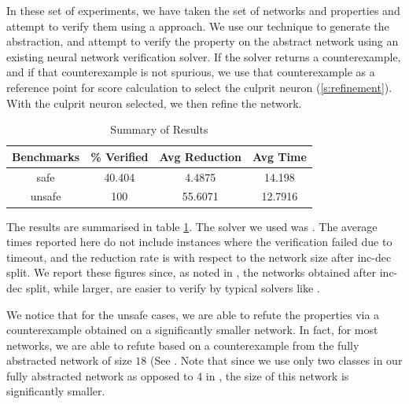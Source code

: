 
In these set of experiments, we have taken the \acasxu set of
networks  and
properties and attempt to verify them using a \cegar approach. We use our
technique to generate the abstraction, and attempt to verify the property on the
abstract network using an existing neural network verification solver. If the
solver returns a counterexample, and if that counterexample is not spurious, we
use that counterexample as a reference point for score calculation  to select
the culprit neuron (\ref{s:refinement}). With the culprit neuron selected, we
then refine the network.

\begin{table}
\begin{tabular}{ |c|c|c|c| }
\hline
Benchmarks &    \% Verified &  Avg Reduction &  Avg Time \\
\hline
safe       &        40.404  &         4.4875 &   14.198  \\
unsafe     &       100      &        55.6071 &   12.7916 \\
\hline
\end{tabular}
\caption{Summary of \acasxu Results }
\label{t:acas-summary}
\end{table}

The results are summarised in table \ref{t:acas-summary}. The solver we used was
\abcrown. The average times reported here do not include instances where the
verification failed due to timeout, and the reduction rate is with respect to
the network size after inc-dec split. We report these figures since, as noted in
\cite{cegar-nn}, the networks obtained after inc-dec split, while larger, are
easier to verify by typical solvers like \marabou.

We notice that for the unsafe cases, we are able to refute the
properties via a counterexample obtained on a significantly smaller network. In
fact, for most networks, we are able to refute based on a counterexample from
the fully abstracted network of size $18$ (See . Note that since we use only two classes in our
fully abstracted network as opposed to 4 in \cite{cegar-nn}, the size of this
network is significantly smaller. 

